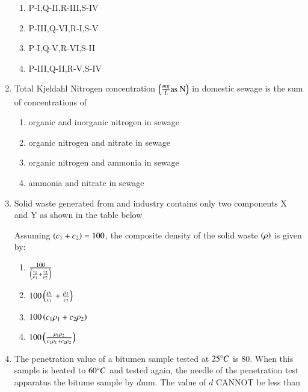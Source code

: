 \documentclass[journal]{IEEEtran}
\begin{document}
\begin{enumerate}
{\begin{multicols}{2}
\begin{enumerate}
\item P-I,Q-II,R-III,S-IV
\item P-III,Q-VI,R-I,S-V
\item P-I,Q-V,R-VI,S-II
\item P-III,Q-II,R-V,S-IV
\end{enumerate}
\end{multicols}
}
\item{
Total Kjeldahl Nitrogen  concentration $\left(\frac{mg}{L}\text{as N}\right)$ in domestic sewage is the sum of concentrations of
\begin{multicols}{2}
\begin{enumerate}
\item organic and inorganic nitrogen in sewage
\item organic nitrogen and nitrate in sewage
\item organic nitrogen and ammonia in sewage
\item ammonia and nitrate in sewage
\end{enumerate}
\end{multicols}
}
\item{
Solid waste generated from and industry contains only two components X and Y as shown in the table below
\begin{table}[h!]    
  \centering
  
\end{table}
Assuming $\left(c_1+c_2\right)=100$, the composite density of the solid waste $\left(\rho\right)$ is given by:
\begin{multicols}{2}
\begin{enumerate}
\item $\frac{100}{\left(\frac{c_1}{\rho_1}+\frac{c_2}{\rho_2}\right)}$
\item $100\left(\frac{\rho_1}{c_1}+\frac{\rho_2}{c_2}\right)$
\item $100\left(c_1\rho_1+c_2\rho_2\right)$
\item $100\left(\frac{\rho_1\rho_2}{c_1\rho_1+c_2\rho_2}\right)$
\end{enumerate}
\end{multicols}
}
\item{
The penetration value of a bitumen sample tested at $25\degree C$ is $80$. When this sample is heated to $60\degree C$ and tested again, the needle of the penetration test apparatus the bitume sample by $d$mm. The value of $d$ CANNOT be less than  
\begin{multicols}{4}

\end{multicols}}
\end{enumerate}
\end{document}
